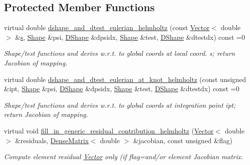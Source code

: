 \subsection*{Protected Member Functions}
\begin{DoxyCompactItemize}
\item 
virtual double \hyperlink{classoomph_1_1HelmholtzEquations_a9a64bff0cb0c873e50eba0f39ace79f1}{dshape\+\_\+and\+\_\+dtest\+\_\+eulerian\+\_\+helmholtz} (const \hyperlink{classoomph_1_1Vector}{Vector}$<$ double $>$ \&\hyperlink{cfortran_8h_ab7123126e4885ef647dd9c6e3807a21c}{s}, \hyperlink{classoomph_1_1Shape}{Shape} \&psi, \hyperlink{classoomph_1_1DShape}{D\+Shape} \&dpsidx, \hyperlink{classoomph_1_1Shape}{Shape} \&test, \hyperlink{classoomph_1_1DShape}{D\+Shape} \&dtestdx) const =0
\begin{DoxyCompactList}\small\item\em Shape/test functions and derivs w.\+r.\+t. to global coords at local coord. s; return Jacobian of mapping. \end{DoxyCompactList}\item 
virtual double \hyperlink{classoomph_1_1HelmholtzEquations_a4559bf3e98ee0efa33f6efc11292ad3e}{dshape\+\_\+and\+\_\+dtest\+\_\+eulerian\+\_\+at\+\_\+knot\+\_\+helmholtz} (const unsigned \&ipt, \hyperlink{classoomph_1_1Shape}{Shape} \&psi, \hyperlink{classoomph_1_1DShape}{D\+Shape} \&dpsidx, \hyperlink{classoomph_1_1Shape}{Shape} \&test, \hyperlink{classoomph_1_1DShape}{D\+Shape} \&dtestdx) const =0
\begin{DoxyCompactList}\small\item\em Shape/test functions and derivs w.\+r.\+t. to global coords at integration point ipt; return Jacobian of mapping. \end{DoxyCompactList}\item 
virtual void \hyperlink{classoomph_1_1HelmholtzEquations_a24fbdea32fd24f0cef97d34cf99c36a3}{fill\+\_\+in\+\_\+generic\+\_\+residual\+\_\+contribution\+\_\+helmholtz} (\hyperlink{classoomph_1_1Vector}{Vector}$<$ double $>$ \&residuals, \hyperlink{classoomph_1_1DenseMatrix}{Dense\+Matrix}$<$ double $>$ \&jacobian, const unsigned \&flag)
\begin{DoxyCompactList}\small\item\em Compute element residual \hyperlink{classoomph_1_1Vector}{Vector} only (if flag=and/or element Jacobian matrix. \end{DoxyCompactList}\end{DoxyCompactItemize}
